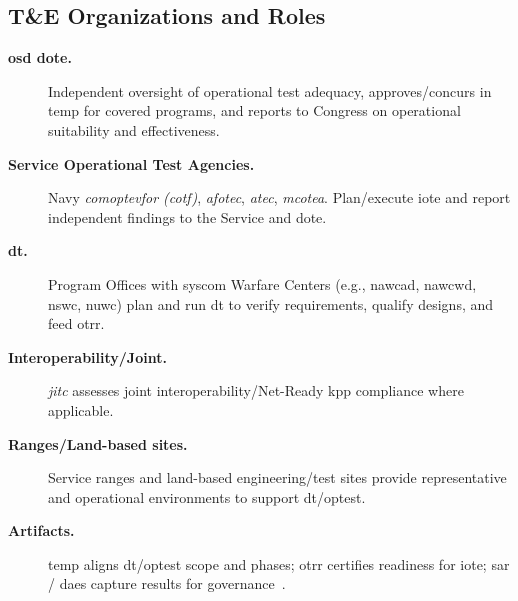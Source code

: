 \documentclass[../main.tex]{subfiles}
\begin{document}

\subsection{T\&E Organizations and Roles}
\begin{description}
  \item[\textbf{\ac{osd} \ac{dote}.}] Independent oversight of operational test adequacy, approves/concurs in \ac{temp} for covered programs, and reports to Congress on operational suitability and effectiveness.
  \item[\textbf{Service Operational Test Agencies.}] Navy \emph{\ac{comoptevfor} (\acs{cotf})}, \emph{\ac{afotec}}, \emph{\ac{atec}}, \emph{\ac{mcotea}}. Plan/execute \ac{iote} and report independent findings to the Service and \ac{dote}.
  \item[\textbf{\ac{dt}.}] Program Offices with \ac{syscom} Warfare Centers (e.g., \ac{nawcad}, \ac{nawcwd}, \ac{nswc}, \ac{nuwc}) plan and run \ac{dt} to verify requirements, qualify designs, and feed \ac{otrr}.
  \item[\textbf{Interoperability/Joint.}] \emph{\ac{jitc}} assesses joint interoperability/Net-Ready \ac{kpp} compliance where applicable.
  \item[\textbf{Ranges/Land-based sites.}] Service ranges and land-based engineering/test sites provide representative and operational environments to support \ac{dt}/\ac{optest}.
  \item[\textbf{Artifacts.}] \ac{temp} aligns \ac{dt}/\ac{optest} scope and phases; \ac{otrr} certifies readiness for \ac{iote}; \ac{sar} / \ac{daes} capture results for governance~\autocite{DoDI5000-85}.
\end{description}
\end{document}
